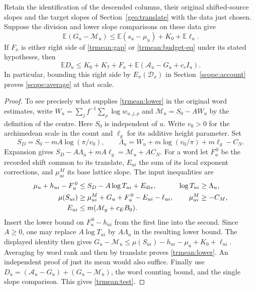 \begin{proposition}\label{trmean:assembly}
Retain the identification of the descended columns, their original
shifted-source slopes and the target slopes of Section~\ref{geo:translate}
with the data just chosen. Suppose the division and lower slope
comparisons on these data give
\begin{equation}\label{trmean:lower}
 \mathbb E(G_u-\mathcal M_u)
       \le \mathbb E(s_u-\mu_u)+K_0+\mathbb E\ell_u .
\end{equation}
If \(F_x\) is either right side of \eqref{trmean:gap} or
\eqref{trmean:budget-eq} under its stated hypotheses, then
\begin{equation}\label{trmean:test}
 \mathbb E D_u\le K_0+K_7+F_x+
                  \mathbb E(\mathcal A_u-G_u+c_s I_u).
\end{equation}
In particular, bounding this right side by \(E_x(\mathcal D_x)\) in
Section~\ref{scope:account} proves \eqref{scope:average} at that scale.
\end{proposition}
\begin{proof}
To see precisely what supplies \eqref{trmean:lower} in the original
word estimates, write \(W_u=\sum_j f^{-1}\sum_\rho\log w_{u,j,\rho}\)
and \(\mathcal M_u=S_0-AW_u\) by the definition of the centre.
Here \(S_0\) is independent of \(u\). Write \(v_0>0\) for the
archimedean scale in the count and \(\ell_g\) for its additive height
parameter. Set
\[
 S_D=S_0-mA\log(\pi/v_0),\qquad
 \Lambda_u=W_u+m\log(v_0/\pi)+m\ell_g-C_N .
\]
Expansion gives \(S_D-A\Lambda_u+mA\ell_g=\mathcal M_u+AC_N\).
For a word let \(F_u^{\,0}\) be the recorded shift common to its
translate, \(E_{ui}\) the sum of its local exponent corrections,
and \(\mu^M_{ui}\) its base lattice slope. The input inequalities are
\[
\begin{aligned}
 \mu_u+h_{ui}-F_u^{\,0}
    &\le S_D-A\log T_{ui}+E_{\rm div},&
 \log T_{ui}&\ge\Lambda_u,\\
 \mu(S_{ui})&\ge\mu^M_{ui}+G_u+F_u^{\,0}-E_{ui}-\ell_{ui},&
 \mu^M_{ui}&\ge-C_M,\\
 E_{ui}&\le m(A\ell_g+c_EB_0).&&
\end{aligned}
\]
Insert the lower bound on \(F_u^{\,0}-h_{ui}\) from the first line
into the second. Since \(A\ge0\), one may replace \(A\log T_{ui}\)
by \(A\Lambda_u\) in the resulting lower bound. The displayed identity
then gives \(G_u-\mathcal M_u\le\mu(S_{ui})-h_{ui}-\mu_u+
K_0+\ell_{ui}\). Averaging by word rank and then by translate proves
\eqref{trmean:lower}. An independent proof of just its mean would
also suffice. Finally use
\(D_u=(\mathcal A_u-G_u)+(G_u-\mathcal M_u)\), the word counting
bound, and the single slope comparison. This gives \eqref{trmean:test}.
\end{proof}

